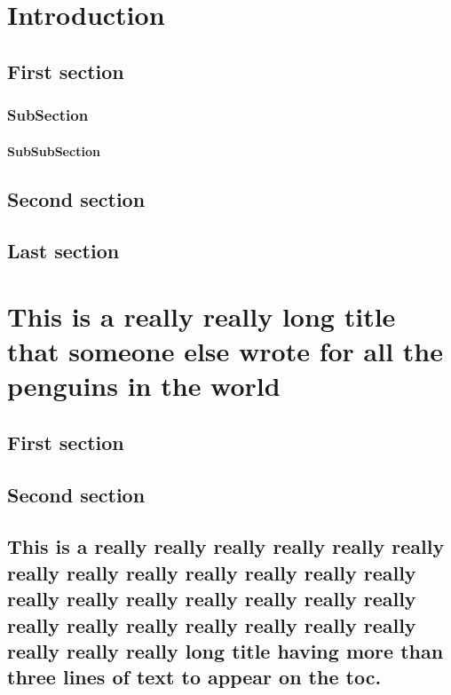 \documentclass{mines-thesis}
\begin{document}
%
\chapter{Introduction} \lipsum[1]
\section{First section} \lipsum[2-3]
\subsection{SubSection}\lipsum[1]
\subsubsection{SubSubSection}\lipsum[1]
\section{Second section} \lipsum[4-5]
\section{Last section} \lipsum[6-7]

\chapter{This is a really really long title that someone else wrote for all the penguins in the world}
\lipsum[1-2]
\section{First section} \lipsum[2-3]
\section{Second section} \lipsum[4-5]
\section{This is a really really really really really really really really really really really really really really really really really really really really really really really really really really really really really really long title having more than three lines of text to appear on the toc.}
\lipsum[1-2]

\lipsum[1-2]
\end{document}
